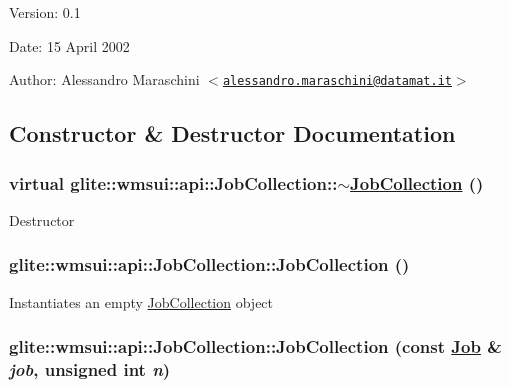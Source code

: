 \begin{Desc}
\item[Version:]0.1 \end{Desc}
\begin{Desc}
\item[Date:]15 April 2002 \end{Desc}
\begin{Desc}
\item[Author:]Alessandro Maraschini $<$\href{mailto:alessandro.maraschini@datamat.it}{\tt alessandro.maraschini@datamat.it}$>$ \end{Desc}




\subsection{Constructor \& Destructor Documentation}
\hypertarget{classglite_1_1wmsui_1_1api_1_1JobCollection_z1_0}{
\subsubsection[$\sim$JobCollection]{\setlength{\rightskip}{0pt plus 5cm}virtual glite::wmsui::api::Job\-Collection::$\sim$\hyperlink{classglite_1_1wmsui_1_1api_1_1JobCollection}{Job\-Collection} ()}}
\label{classglite_1_1wmsui_1_1api_1_1JobCollection_z1_0}


Destructor \hypertarget{classglite_1_1wmsui_1_1api_1_1JobCollection_z1_1}{
\subsubsection[JobCollection]{\setlength{\rightskip}{0pt plus 5cm}glite::wmsui::api::Job\-Collection::Job\-Collection ()}}
\label{classglite_1_1wmsui_1_1api_1_1JobCollection_z1_1}


Instantiates an empty \hyperlink{classglite_1_1wmsui_1_1api_1_1JobCollection}{Job\-Collection} object \hypertarget{classglite_1_1wmsui_1_1api_1_1JobCollection_z1_2}{
\subsubsection[JobCollection]{\setlength{\rightskip}{0pt plus 5cm}glite::wmsui::api::Job\-Collection::Job\-Collection (const \hyperlink{classglite_1_1wmsui_1_1api_1_1Job}{Job} \& {\em job}, unsigned int {\em n})}}
\label{classglite_1_1wmsui_1_1api_1_1JobCollection_z1_2}


